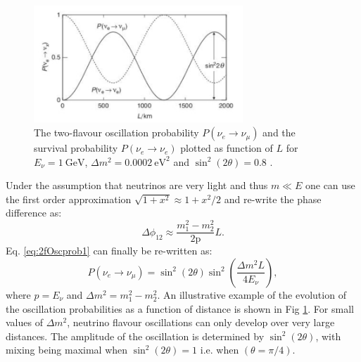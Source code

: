 \begin{figure}[t]
     \centering
     \includegraphics[width=0.7\textwidth]{figures/ch2-Theory/Oscillation2F.png}
     \caption[Two-flavour oscillation probability]{The two-flavour oscillation probability $P(\nu_e \rightarrow \nu_\mu)$ and the survival probability $P(\nu_e \rightarrow \nu_e)$ plotted as function of $L$ for $E_\nu= 1 \ \text{GeV}$, $\Delta m^2=0.0002 \ \text{eV}^2$ and $\sin^2(2\theta)=0.8$ \cite{Thomson_2013}.}
        \label{fig:Oscillation2F}
\end{figure}
Under the assumption that neutrinos are very light and thus $m\ll E$ one can use the first order approximation $\sqrt{1+x^2}\approx1+x^2/2$ and re-write the phase difference as:
\begin{equation}
\label{eq:deltaphi12}
    \Delta \phi_{12} \approx \frac{m_1^2-m_2^2}{2\text{p}}L .
\end{equation}
Eq. \ref{eq:2fOscprob1} can finally be re-written as:
\begin{equation}        P(\nu_e\rightarrow\nu_\mu)=\sin^2(2\theta)\sin^2\left(\frac{\Delta m^2 L}{4E_\nu}\right) ,       
\end{equation}
where $p=E_\nu$ and $\Delta m^2 = m_1^2-m_2^2$. An illustrative example of the evolution of the oscillation probabilities as a function of distance is shown in Fig \ref{fig:Oscillation2F}. For small values of $\Delta m^2$, neutrino flavour oscillations can only develop over very large distances. The amplitude of the oscillation is determined by $\sin^2(2\theta)$, with mixing being maximal when $\sin^2(2\theta)=1$ i.e. when $(\theta = \pi/4)$.

